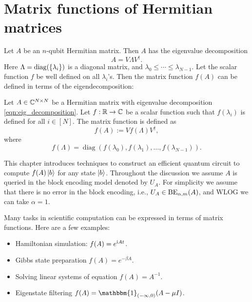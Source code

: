 \chapter{Matrix functions of Hermitian matrices}\label{chap:hermfunc}

Let $A$ be an $n$-qubit Hermitian matrix.
Then $A$ has the eigenvalue decomposition 
\begin{equation}
A=V\Lambda V^{\dag}.
\label{eqn:eig_decomposition}
\end{equation}
Here $\Lambda=\operatorname{diag}(\{\lambda_i\})$ is a diagonal matrix, and $\lambda_0\le \cdots\le \lambda_{N-1}$. 
Let the scalar function $f$ be well defined on all $\lambda_i$'s.
Then the matrix function $f(A)$ can be defined in terms of the eigendecomposition:

\begin{defn}
\label{def:matrix_function}
 Let $A\in \mathbb{C}^{N\times N}$ be a Hermitian matrix with eigenvalue decomposition \cref{eqn:eig_decomposition}. Let $f: \mathbb{R} \rightarrow \mathbb{\mathbb{C}}$ be a scalar function such that $f\left(\lambda_{i}\right)$ is defined for all $i\in[N]$. The  matrix function is defined as
\begin{equation}
f(A):=Vf(\Lambda)V^{\dag},
\label{eqn:matrix_function}
\end{equation}
where 
\begin{equation}
f\left(\Lambda\right)=\operatorname{diag}\left(f\left(\lambda_{0}\right), f\left(\lambda_{1}\right), \ldots, f\left(\lambda_{N-1}\right)\right).
\end{equation}
\end{defn}

This chapter introduces techniques to construct an efficient quantum circuit to compute $f(A)\ket{b}$ for any state $\ket{b}$. 
Throughout the discussion we assume $A$ is queried in the block encoding model denoted by $U_A$. 
For simplicity we assume that there is no error in the block encoding, i.e.,
$U_A\in\operatorname{BE}_{\alpha,m}(A)$, and WLOG we can take $\alpha=1$.

Many tasks in scientific computation can be expressed in terms of matrix functions. Here are a few examples:

\begin{itemize}

\item Hamiltonian simulation: $f(A)=e^{\mathrm{i} At}$.

\item Gibbs state preparation $f(A)=e^{-\beta A}$.

\item Solving linear systems of equation $f(A)=A^{-1}$.

\item Eigenstate filtering $f(A)=\mathbbm{1}_{(-\infty,0)}(A-\mu I)$.

\end{itemize}

